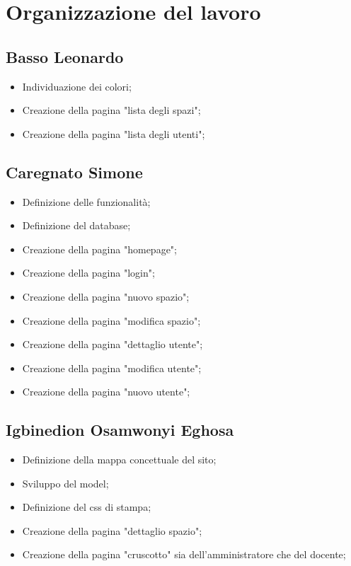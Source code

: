 \section{Organizzazione del lavoro}

\subsection{Basso Leonardo}
\begin{itemize}
	\item Individuazione dei colori;
	\item Creazione della pagina "lista degli spazi";
	\item Creazione della pagina "lista degli utenti";
\end{itemize}

\subsection{Caregnato Simone}
\begin{itemize}
	\item Definizione delle funzionalità;
	\item Definizione del database;
	\item Creazione della pagina "homepage";
	\item Creazione della pagina "login";
	\item Creazione della pagina "nuovo spazio";
	\item Creazione della pagina "modifica spazio";
	\item Creazione della pagina "dettaglio utente";
	\item Creazione della pagina "modifica utente";
	\item Creazione della pagina "nuovo utente";
\end{itemize}

\subsection{Igbinedion Osamwonyi Eghosa}
\begin{itemize}
	\item Definizione della mappa concettuale del sito;
	\item Sviluppo del model;
	\item Definizione del css di stampa;
	\item Creazione della pagina "dettaglio spazio";
	\item Creazione della pagina "cruscotto" sia dell'amministratore che
	      del docente;
\end{itemize}

